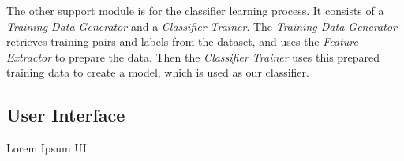 The other support module is for the classifier learning process. It consists of a \emph{Training Data Generator} and a \emph{Classifier Trainer}. The \emph{Training Data Generator} retrieves training pairs and labels from the dataset, and uses the \emph{Feature Extractor} to prepare the data. Then the \emph{Classifier Trainer} uses this prepared training data to create a model, which is used as our classifier.

\subsection{User Interface}


Lorem Ipsum UI










